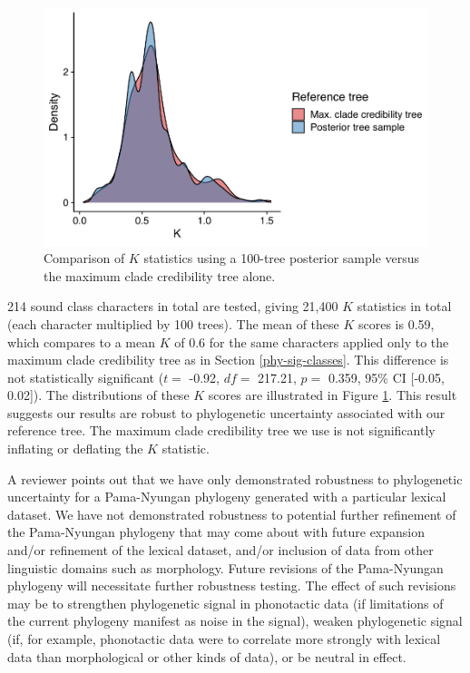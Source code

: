 \begin{figure}[tbp]

{\centering \includegraphics[width=0.66\linewidth]{05-phylo-signal/fig/k-mcct-posterior} 

}

\caption[$K$ statistics using a 100-tree posterior sample versus the maximum clade credibility tree alone]{Comparison of $K$ statistics using a 100-tree posterior sample versus the maximum clade credibility tree alone.}\label{fig:tree-uncertainty}
\end{figure}

214 sound class characters in total are tested, giving 21,400 \(K\) statistics in total (each character multiplied by 100 trees). The mean of these \(K\) scores is 0.59, which compares to a mean \(K\) of 0.6 for the same characters applied only to the maximum clade credibility tree as in Section \ref{phy-sig-classes}. This difference is not statistically significant (\(t=\) -0.92, \(df=\) 217.21, \(p=\) 0.359, 95\% CI {[}-0.05, 0.02{]}). The distributions of these \(K\) scores are illustrated in Figure \ref{fig:tree-uncertainty}. This result suggests our results are robust to phylogenetic uncertainty associated with our reference tree. The maximum clade credibility tree we use is not significantly inflating or deflating the \(K\) statistic.

A reviewer points out that we have only demonstrated robustness to phylogenetic uncertainty for a Pama-Nyungan phylogeny generated with a particular lexical dataset. We have not demonstrated robustness to potential further refinement of the Pama-Nyungan phylogeny that may come about with future expansion and/or refinement of the lexical dataset, and/or inclusion of data from other linguistic domains such as morphology. Future revisions of the Pama-Nyungan phylogeny will necessitate further robustness testing. The effect of such revisions may be to strengthen phylogenetic signal in phonotactic data (if limitations of the current phylogeny manifest as noise in the signal), weaken phylogenetic signal (if, for example, phonotactic data were to correlate more strongly with lexical data than morphological or other kinds of data), or be neutral in effect.

